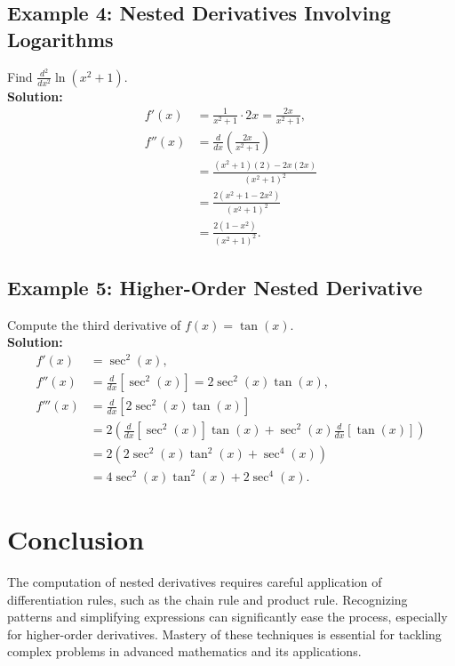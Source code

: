 \documentclass{article}
\begin{document}
\subsection{Example 4: Nested Derivatives Involving Logarithms}
Find $\frac{d^2}{dx^2} \ln(x^2 + 1)$. \\
\textbf{Solution:}
\begin{align*}
f'(x) &= \frac{1}{x^2 + 1} \cdot 2x = \frac{2x}{x^2 + 1}, \\
f''(x) &= \frac{d}{dx}\left(\frac{2x}{x^2 + 1}\right) \\
&= \frac{(x^2 + 1)(2) - 2x(2x)}{(x^2 + 1)^2} \\
&= \frac{2(x^2 + 1 - 2x^2)}{(x^2 + 1)^2} \\
&= \frac{2(1 - x^2)}{(x^2 + 1)^2}.
\end{align*}

\subsection{Example 5: Higher-Order Nested Derivative}
Compute the third derivative of $f(x) = \tan(x)$. \\
\textbf{Solution:}
\begin{align*}
f'(x) &= \sec^2(x), \\
f''(x) &= \frac{d}{dx}[\sec^2(x)] = 2\sec^2(x)\tan(x), \\
f'''(x) &= \frac{d}{dx}[2\sec^2(x)\tan(x)] \\
&= 2 \left(\frac{d}{dx}[\sec^2(x)] \tan(x) + \sec^2(x) \frac{d}{dx}[\tan(x)]\right) \\
&= 2 \left(2\sec^2(x)\tan^2(x) + \sec^4(x)\right) \\
&= 4\sec^2(x)\tan^2(x) + 2\sec^4(x).
\end{align*}

\section{Conclusion}
The computation of nested derivatives requires careful application of differentiation rules, such as the chain rule and product rule. Recognizing patterns and simplifying expressions can significantly ease the process, especially for higher-order derivatives. Mastery of these techniques is essential for tackling complex problems in advanced mathematics and its applications.
\end{document}
